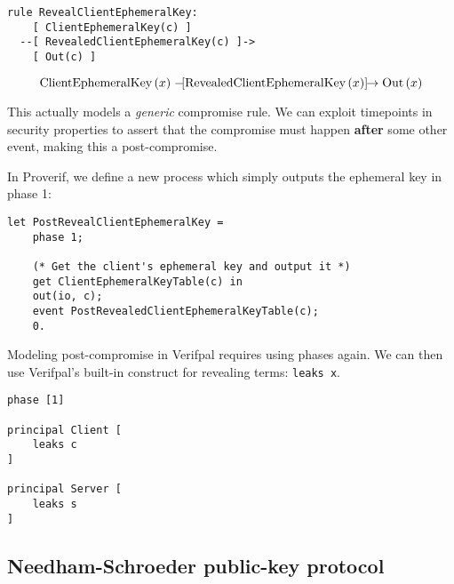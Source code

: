 \lstset{language=tamarin}
\begin{lstlisting}
rule RevealClientEphemeralKey:
    [ ClientEphemeralKey(c) ]
  --[ RevealedClientEphemeralKey(c) ]->
    [ Out(c) ]
\end{lstlisting}

\begin{equation}
\mbox{ClientEphemeralKey}\left(x\right) \mathrel{-\hspace{-2pt}[\mbox{RevealedClientEphemeralKey}\left(x\right)]\hspace{-4pt}\to} \mbox{Out}\left(x\right)
\end{equation}

This actually models a \textit{generic} compromise rule. We can exploit timepoints in security properties to assert that the compromise must happen \textbf{after} some other event, making this a post-compromise.

In Proverif, we define a new process which simply outputs the ephemeral key in phase 1:

\lstset{language=proverif}
\begin{lstlisting}
let PostRevealClientEphemeralKey =
    phase 1;

    (* Get the client's ephemeral key and output it *)
    get ClientEphemeralKeyTable(c) in
    out(io, c);
    event PostRevealedClientEphemeralKeyTable(c);
    0.
\end{lstlisting}

\lstset{language=verifpal}
Modeling post-compromise in Verifpal requires using phases again. We can then use Verifpal's built-in construct for revealing terms: \lstinline{leaks x}.  
\begin{lstlisting}
phase [1]

principal Client [
    leaks c
]

principal Server [
    leaks s
]
\end{lstlisting}

\subsection{Needham-Schroeder public-key protocol}

